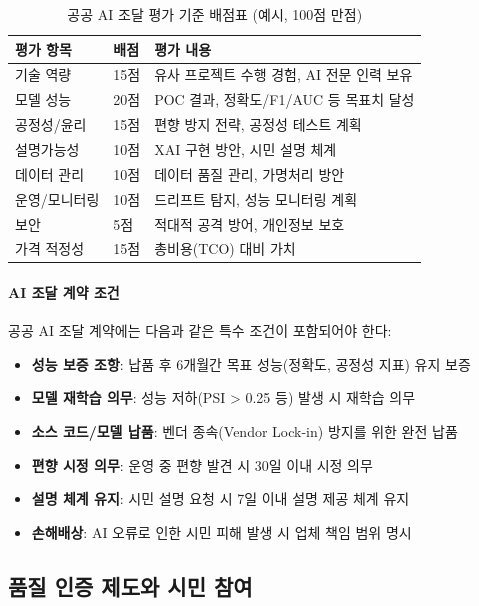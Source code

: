 \begin{table}[htbp]
\centering
\caption{공공 AI 조달 평가 기준 배점표 (예시, 100점 만점)}
\label{tab:18_eval_criteria}
\begin{tabularx}{\textwidth}{p{3.5cm}p{1.5cm}X}
\toprule
\textbf{평가 항목} & \textbf{배점} & \textbf{평가 내용} \\
\midrule
기술 역량 & 15점 & 유사 프로젝트 수행 경험, AI 전문 인력 보유 \\
모델 성능 & 20점 & POC 결과, 정확도/F1/AUC 등 목표치 달성 \\
공정성/윤리 & 15점 & 편향 방지 전략, 공정성 테스트 계획 \\
설명가능성 & 10점 & XAI 구현 방안, 시민 설명 체계 \\
데이터 관리 & 10점 & 데이터 품질 관리, 가명처리 방안 \\
운영/모니터링 & 10점 & 드리프트 탐지, 성능 모니터링 계획 \\
보안 & 5점 & 적대적 공격 방어, 개인정보 보호 \\
가격 적정성 & 15점 & 총비용(TCO) 대비 가치 \\
\bottomrule
\end{tabularx}
\end{table}

\paragraph{AI 조달 계약 조건}

공공 AI 조달 계약에는 다음과 같은 특수 조건이 포함되어야 한다:

\begin{itemize}
    \item \textbf{성능 보증 조항}: 납품 후 6개월간 목표 성능(정확도, 공정성 지표) 유지 보증
    \item \textbf{모델 재학습 의무}: 성능 저하(PSI > 0.25 등) 발생 시 재학습 의무
    \item \textbf{소스 코드/모델 납품}: 벤더 종속(Vendor Lock-in) 방지를 위한 완전 납품
    \item \textbf{편향 시정 의무}: 운영 중 편향 발견 시 30일 이내 시정 의무
    \item \textbf{설명 체계 유지}: 시민 설명 요청 시 7일 이내 설명 제공 체계 유지
    \item \textbf{손해배상}: AI 오류로 인한 시민 피해 발생 시 업체 책임 범위 명시
\end{itemize}

\subsection{품질 인증 제도와 시민 참여}
\label{sec:18.3.2}

